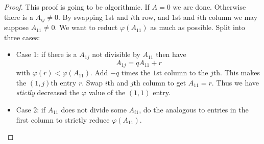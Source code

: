 \documentclass[a4paper]{article}
\begin{document}
\begin{proof}
  This proof is going to be algorithmic. If \(A = 0\) we are done. Otherwise there is a \(A_{ij} \neq 0\). By swapping \(1\)st and \(i\)th row, and \(1\)st and \(i\)th column we may suppose \(A_{11} \neq 0\). We want to reduct \(\varphi(A_{11})\) as much as possible. Split into three cases:
  \begin{itemize}
  \item Case 1: if there is a \(A_{1j}\) not divisible by \(A_{11}\) then have
    \[
      A_{1j} = q A_{11} + r
    \]
    with \(\varphi(r) < \varphi(A_{11})\). Add \(-q\) times the \(1\)st column to the \(j\)th. This makes the \((1,j)\)th entry \(r\). Swap \(i\)th and \(j\)th column to get \(A_{11} = r\). Thus we have \emph{stictly} decreased the \(\varphi\) value of the \((1, 1)\) entry.
  \item Case 2: if \(A_{11}\) does not divide some \(A_{i1}\), do the analogous to entries in the first column to strictly reduce \(\varphi(A_{11})\).


\end{itemize}
\end{proof}
\end{document}
